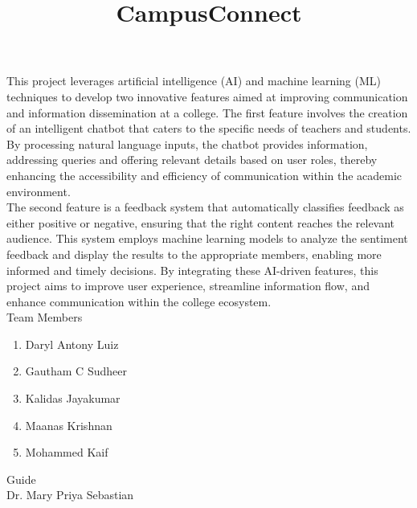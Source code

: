 \documentclass[12pt]{article}
\title{CampusConnect}
\author{}
\date{}
\begin{document}
	
	\maketitle
	\thispagestyle{empty}
	
	This project leverages artificial intelligence (AI) and machine learning (ML) techniques to develop two innovative features aimed at improving communication and information dissemination at a college. The first feature involves the creation of an intelligent chatbot that caters to the specific needs of teachers and students. By processing natural language inputs, the chatbot provides information, addressing queries and offering relevant details based on user roles, thereby enhancing the accessibility and efficiency of communication within the academic environment.\\
	
	The second feature is a feedback system that automatically classifies feedback as either positive or negative, ensuring that the right content reaches the relevant audience. This system employs machine learning models to analyze the sentiment feedback and display the results to the appropriate members, enabling more informed and timely decisions. By integrating these AI-driven features, this project aims to improve user experience, streamline information flow, and enhance communication within the college ecosystem.\\
	
	\bigskip
	Team Members
	\begin{enumerate}
		\item Daryl Antony Luiz
		\item Gautham C Sudheer
		\item Kalidas Jayakumar
		\item Maanas Krishnan
		\item Mohammed Kaif
	\end{enumerate}
	\bigskip
	
	Guide\\
	Dr. Mary Priya Sebastian
	
\end{document}
